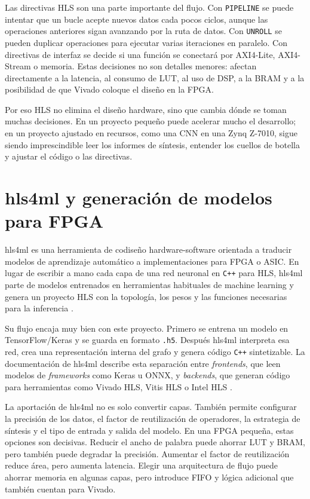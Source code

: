 Las directivas \ac{HLS} son una parte importante del flujo. Con \texttt{PIPELINE} se
puede intentar que
un bucle acepte nuevos datos cada pocos ciclos, aunque las operaciones anteriores sigan avanzando
por la ruta de datos. Con \texttt{UNROLL} se pueden duplicar operaciones para ejecutar varias
iteraciones en paralelo. Con directivas de interfaz se decide si una función se conectará por
AXI4-Lite, AXI4-Stream o memoria. Estas decisiones no son detalles menores: afectan directamente a
la latencia, al consumo de \ac{LUT}, al uso de \ac{DSP}, a la \ac{BRAM} y a la
posibilidad de que Vivado coloque
el diseño en la \ac{FPGA}.

Por eso \ac{HLS} no elimina el diseño hardware, sino que cambia dónde se toman muchas
decisiones. En un
proyecto pequeño puede acelerar mucho el desarrollo; en un proyecto ajustado en recursos, como una
\ac{CNN} en una Zynq Z-7010, sigue siendo imprescindible leer los informes de síntesis, entender los
cuellos de botella y ajustar el código o las directivas.

\section{hls4ml y generación de modelos para FPGA}
hls4ml \citep{fastml_hls4ml} es una herramienta de codiseño hardware-software orientada a traducir
modelos de aprendizaje
automático a implementaciones para \ac{FPGA} o \ac{ASIC}. En lugar de escribir a mano
cada capa de una red
neuronal en \texttt{C++} para \ac{HLS}, hls4ml parte de modelos entrenados en
herramientas habituales de machine
learning y genera un proyecto \ac{HLS} con la topología, los pesos y las funciones
necesarias para la
inferencia \citep{fahim2021hls4mlopensourcecodesignworkflow}.

Su flujo encaja muy bien con este proyecto. Primero se entrena un modelo en TensorFlow/Keras y se
guarda en formato \texttt{.h5}. Después hls4ml interpreta esa red, crea una representación interna
del grafo y genera código \texttt{C++} sintetizable. La documentación de hls4ml describe
esta separación
entre \textit{frontends}, que leen modelos de \textit{frameworks} como Keras u ONNX, y
\textit{backends}, que generan código
para herramientas como Vivado \ac{HLS}, Vitis HLS o Intel HLS \citep{hls4mlDocs}.

La aportación de hls4ml no es solo convertir capas. También permite configurar la precisión de los
datos, el factor de reutilización de operadores, la estrategia de síntesis y el tipo de entrada y
salida del modelo. En una \ac{FPGA} pequeña, estas opciones son decisivas. Reducir el
ancho de palabra
puede ahorrar \ac{LUT} y \ac{BRAM}, pero también puede degradar la precisión. Aumentar el factor de
reutilización reduce área, pero aumenta latencia. Elegir una arquitectura de flujo puede ahorrar
memoria en algunas capas, pero introduce FIFO y lógica adicional que también cuentan para Vivado.

